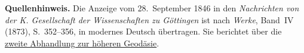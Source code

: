 \par\medskip\begin{small}\noindent\textbf{Quellenhinweis.} Die Anzeige vom 28.~September 1846 in den \textit{Nachrichten von der K. Gesellschaft der Wissenschaften zu Göttingen} ist nach \textit{Werke}, Band~IV (1873), S.~352--356, in modernes Deutsch übertragen. Sie berichtet über die \hyperlink{geodaesie2.0}{zweite Abhandlung zur höheren Geodäsie}.\par\end{small}
